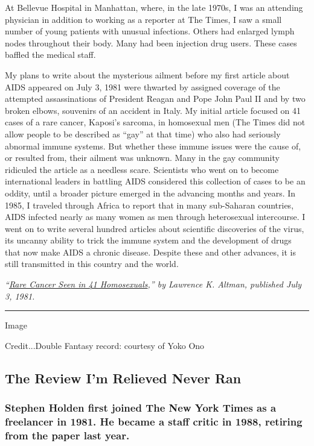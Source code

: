 At Bellevue Hospital in Manhattan, where, in the late 1970s, I was an
attending physician in addition to working as a reporter at The Times, I
saw a small number of young patients with unusual infections. Others had
enlarged lymph nodes throughout their body. Many had been injection drug
users. These cases baffled the medical staff.

My plans to write about the mysterious ailment before my first article
about AIDS appeared on July 3, 1981 were thwarted by assigned coverage
of the attempted assassinations of President Reagan and Pope John Paul
II and by two broken elbows, souvenirs of an accident in Italy. My
initial article focused on 41 cases of a rare cancer, Kaposi's sarcoma,
in homosexual men (The Times did not allow people to be described as
``gay'' at that time) who also had seriously abnormal immune systems.
But whether these immune issues were the cause of, or resulted from,
their ailment was unknown. Many in the gay community ridiculed the
article as a needless scare. Scientists who went on to become
international leaders in battling AIDS considered this collection of
cases to be an oddity, until a broader picture emerged in the advancing
months and years. In 1985, I traveled through Africa to report that in
many sub-Saharan countries, AIDS infected nearly as many women as men
through heterosexual intercourse. I went on to write several hundred
articles about scientific discoveries of the virus, its uncanny ability
to trick the immune system and the development of drugs that now make
AIDS a chronic disease. Despite these and other advances, it is still
transmitted in this country and the world.

\emph{``\href{https://www.nytimes.com/1981/07/03/us/rare-cancer-seen-in-41-homosexuals.html}{Rare
Cancer Seen in 41 Homosexuals},'' by Lawrence K. Altman, published July
3, 1981.}

\begin{center}\rule{0.5\linewidth}{\linethickness}\end{center}

Image

Credit...Double Fantasy record: courtesy of Yoko Ono

\hypertarget{the-review-im-relieved-never-ran}{%
\subsection{The Review I'm Relieved Never
Ran}\label{the-review-im-relieved-never-ran}}

\hypertarget{stephen-holden-first-joined-the-new-york-times-as-a-freelancer-in-1981-he-became-a-staff-critic-in-1988-retiring-from-the-paper-last-year}{%
\subsubsection{Stephen Holden first joined The New York Times as a
freelancer in 1981. He became a staff critic in 1988, retiring from the
paper last
year.}\label{stephen-holden-first-joined-the-new-york-times-as-a-freelancer-in-1981-he-became-a-staff-critic-in-1988-retiring-from-the-paper-last-year}}


